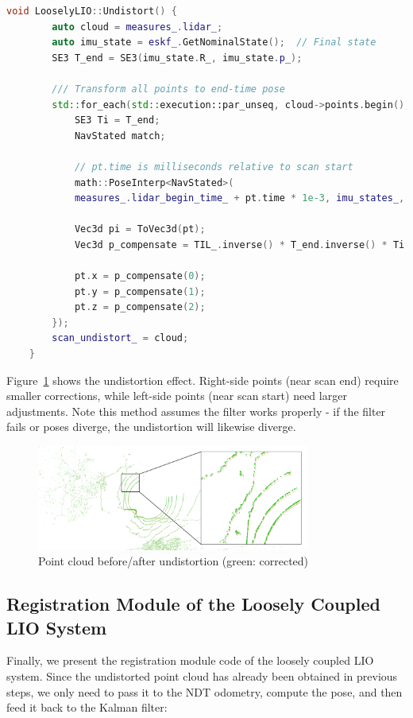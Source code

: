\begin{lstlisting}[language=c++,caption=src/ch7/loosely_coupled_lio/loosly_lio.cc]
	void LooselyLIO::Undistort() {
		auto cloud = measures_.lidar_;
		auto imu_state = eskf_.GetNominalState();  // Final state
		SE3 T_end = SE3(imu_state.R_, imu_state.p_);
		
		/// Transform all points to end-time pose
		std::for_each(std::execution::par_unseq, cloud->points.begin(), cloud->points.end(), [&](auto &pt) {
			SE3 Ti = T_end;
			NavStated match;
			
			// pt.time is milliseconds relative to scan start
			math::PoseInterp<NavStated>(
			measures_.lidar_begin_time_ + pt.time * 1e-3, imu_states_, [](const NavStated &s) { return s.timestamp_; }, [](const NavStated &s) { return s.GetSE3(); }, Ti, match);
			
			Vec3d pi = ToVec3d(pt);
			Vec3d p_compensate = TIL_.inverse() * T_end.inverse() * Ti * TIL_ * pi;
			
			pt.x = p_compensate(0);
			pt.y = p_compensate(1);
			pt.z = p_compensate(2);
		});
		scan_undistort_ = cloud;
	}
\end{lstlisting}

Figure~\ref{fig:cloud-undist} shows the undistortion effect. Right-side points (near scan end) require smaller corrections, while left-side points (near scan start) need larger adjustments. Note this method assumes the filter works properly - if the filter fails or poses diverge, the undistortion will likewise diverge.

\begin{figure}[!t]
	\centering
	\includegraphics[width=0.8\textwidth]{resources/3d-lidar-mapping/cloud_undist}
	\caption{Point cloud before/after undistortion (green: corrected)}
	\label{fig:cloud-undist}
\end{figure}

\subsection{Registration Module of the Loosely Coupled LIO System}
Finally, we present the registration module code of the loosely coupled LIO system. Since the undistorted point cloud has already been obtained in previous steps, we only need to pass it to the NDT odometry, compute the pose, and then feed it back to the Kalman filter:

